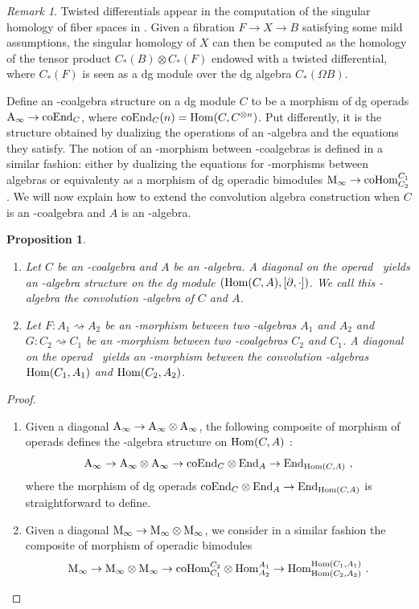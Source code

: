 \documentclass[twoside, 11pt]{amsart}
\newtheorem{proposition}[definition]{Proposition}
\theoremstyle{remark}
\newtheorem{remark}[definition]{\sc Remark}
\begin{document}
\begin{remark}
Twisted differentials appear in the computation of the singular homology of fiber spaces in \cite{Brown59}. 
Given a fibration $F \rightarrow X \rightarrow B$ satisfying some mild assumptions, the singular homology of $X$ can then be computed as the homology of the tensor product $C_*(B) \otimes C_*(F)$ endowed with a twisted differential, where $C_*(F)$ is seen as a dg module over the dg algebra $C_*(\Omega B)$.
\end{remark}

Define an \Ainf -coalgebra structure on a dg module $C$ to be a morphism of dg operads $\mathrm{A}_\infty \rightarrow \mathrm{coEnd}_C$, where $\mathrm{coEnd}_C(n) = \mathrm{Hom} ( C , C^{\otimes n} )$. 
Put differently, it is the structure obtained by dualizing the operations of an \Ainf -algebra and the equations they satisfy.
The notion of an \Ainf -morphism between \Ainf -coalgebras is defined in a similar fashion: either by dualizing the equations for \Ainf -morphisms between \Ainf algebras or equivalenty as a morphism of dg operadic bimodules $\mathrm{M}_\infty \rightarrow \mathrm{coHom}^{C_1}_{C_2}$.
We will now explain how to extend the convolution algebra construction when $C$ is an \Ainf -coalgebra and $A$ is an \Ainf -algebra.

\begin{proposition} 
\label{prop:convolution-ainf}
\begin{enumerate}[leftmargin=*]
    \item Let $C$ be an \Ainf -coalgebra and $A$ be an \Ainf -algebra. 
A diagonal on the operad \Ainf\ yields an \Ainf -algebra structure on the dg module $(\mathrm{Hom} (C,A) , [ \partial , \cdot ])$. 
We call this \Ainf -algebra the \emph{convolution \Ainf -algebra of $C$ and $A$}.
\item Let $F : A_1 \rightsquigarrow A_2$ be an \Ainf -morphism between two \Ainf -algebras $A_1$ and $A_2$ and $G : C_2 \rightsquigarrow C_1$ be an \Ainf -morphism between two \Ainf -coalgebras $C_2$ and $C_1$. A diagonal on the operad \Minf\ yields  an \Ainf -morphism between the convolution \Ainf -algebras $\mathrm{Hom} (C_1,A_1)$ and $\mathrm{Hom} (C_2,A_2)$. 
\end{enumerate}
\end{proposition}

\begin{proof} 
\begin{enumerate}[leftmargin=*]
\item Given a diagonal $\mathrm{A}_\infty \rightarrow \mathrm{A}_\infty \otimes \mathrm{A}_\infty$, the following composite of morphism of operads defines the \Ainf -algebra structure on $\mathrm{Hom}(C,A)$ : 
\[ \mathrm{A}_\infty \to \mathrm{A}_\infty \otimes \mathrm{A}_\infty \to \mathrm{coEnd}_C\otimes \mathrm{End}_A \to \mathrm{End}_{\mathrm{Hom}(C,A)} \ , \]
where the morphism of dg operads $\mathrm{coEnd}_C \otimes \mathrm{End}_A \to \mathrm{End}_{\mathrm{Hom}(C,A)}$ is straightforward to define.
\item Given a diagonal $\mathrm{M}_\infty \rightarrow \mathrm{M}_\infty \otimes \mathrm{M}_\infty$, we consider in a similar fashion the composite of morphism of operadic bimodules
\[ \mathrm{M}_\infty \to \mathrm{M}_\infty \otimes \mathrm{M}_\infty \to \mathrm{coHom}^{C_2}_{C_1} \otimes \mathrm{Hom}^{A_1}_{A_2} \to \mathrm{Hom}^{\mathrm{Hom}(C_1,A_1)}_{\mathrm{Hom}(C_2, A_2)} \ . \] 
\end{enumerate}
\end{proof}
\end{document}
